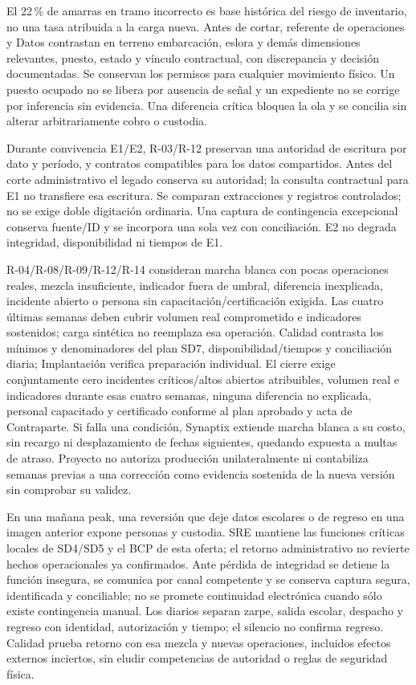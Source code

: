 El 22\,\% de amarras en tramo incorrecto es base histórica del riesgo de inventario, no una tasa atribuida a la carga nueva. Antes de cortar, referente de operaciones y Datos contrastan en terreno embarcación, eslora y demás dimensiones relevantes, puesto, estado y vínculo contractual, con discrepancia y decisión documentadas. Se conservan los permisos para cualquier movimiento físico. Un puesto ocupado no se libera por ausencia de señal y un expediente no se corrige por inferencia sin evidencia. Una diferencia crítica bloquea la ola y se concilia sin alterar arbitrariamente cobro o custodia. \parencite[numeral 17.6, punto 3]{sd8-c07}

Durante convivencia E1/E2, R-03/R-12 preservan una autoridad de escritura por dato y período, y contratos compatibles para los datos compartidos. Antes del corte administrativo el legado conserva su autoridad; la consulta contractual para E1 no transfiere esa escritura. Se comparan extracciones y registros controlados; no se exige doble digitación ordinaria. Una captura de contingencia excepcional conserva fuente/ID y se incorpora una sola vez con conciliación. E2 no degrada integridad, disponibilidad ni tiempos de E1. \parencites[art.~17.2; p.~13]{sd8-ba}[RT-20.03; p.~35]{sd8-bt}

R-04/R-08/R-09/R-12/R-14 consideran marcha blanca con pocas operaciones reales, mezcla insuficiente, indicador fuera de umbral, diferencia inexplicada, incidente abierto o persona sin capacitación/certificación exigida. Las cuatro últimas semanas deben cubrir volumen real comprometido e indicadores sostenidos; carga sintética no reemplaza esa operación. Calidad contrasta los mínimos y denominadores del plan SD7, disponibilidad/tiempos y conciliación diaria; Implantación verifica preparación individual. El cierre exige conjuntamente cero incidentes críticos/altos abiertos atribuibles, volumen real e indicadores durante esas cuatro semanas, ninguna diferencia no explicada, personal capacitado y certificado conforme al plan aprobado y acta de Contraparte. Si falla una condición, Synaptix extiende marcha blanca a su costo, sin recargo ni desplazamiento de fechas siguientes, quedando expuesta a multas de atraso. Proyecto no autoriza producción unilateralmente ni contabiliza semanas previas a una corrección como evidencia sostenida de la nueva versión sin comprobar su validez. \parencite[art.~17.3; p.~13]{sd8-ba}

En una mañana peak, una reversión que deje datos escolares o de regreso en una imagen anterior expone personas y custodia. SRE mantiene las funciones críticas locales de SD4/SD5 y el BCP de esta oferta; el retorno administrativo no revierte hechos operacionales ya confirmados. Ante pérdida de integridad se detiene la función insegura, se comunica por canal competente y se conserva captura segura, identificada y conciliable; no se promete continuidad electrónica cuando sólo existe contingencia manual. Los diarios separan zarpe, salida escolar, despacho y regreso con identidad, autorización y tiempo; el silencio no confirma regreso. Calidad prueba retorno con esa mezcla y nuevas operaciones, incluidos efectos externos inciertos, sin eludir competencias de autoridad o reglas de seguridad física.

